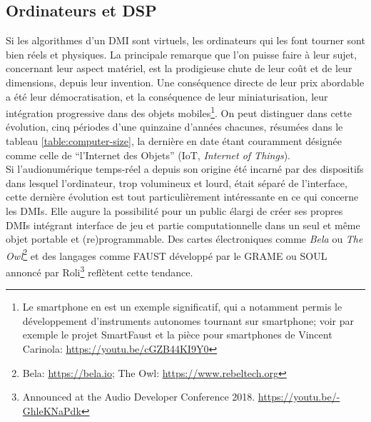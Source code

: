 \subsection{Ordinateurs et DSP}
\label{sec:interfaces:computers_and_dsp}

\noindent Si les algorithmes d'un \gls{DMI} sont virtuels, les ordinateurs qui les font tourner sont bien réels et physiques. La principale remarque que l'on puisse faire à leur sujet, concernant leur aspect matériel, est la prodigieuse chute de leur coût et de leur dimensions, depuis leur invention. Une conséquence directe de leur prix abordable a été leur démocratisation, et la conséquence de leur miniaturisation, leur intégration progressive dans des objets mobiles\footnote{Le smartphone en est un exemple significatif, qui a notamment permis le développement d'instruments autonomes tournant sur smartphone; voir par exemple le projet SmartFaust et la pièce pour smartphones de Vincent Carinola: \url{https://youtu.be/cGZB44KI9Y0}}. On peut distinguer dans cette évolution, cinq périodes d'une quinzaine d'années chacunes, résumées dans le tableau \ref{table:computer-size}, la dernière en date étant couramment désignée comme celle de ``l'Internet des Objets'' (IoT, \textit{Internet of Things}).\\
\indent Si l'audionumérique temps-réel a depuis son origine été incarné par des dispositifs dans lesquel l'ordinateur, trop volumineux et lourd, était séparé de l'interface, cette dernière évolution est tout particulièrement intéressante en ce qui concerne les \glspl{DMI}. Elle augure la possibilité pour un public élargi de créer ses propres \glspl{DMI} intégrant interface de jeu et partie computationnelle dans un seul et même objet portable et (re)programmable. Des cartes électroniques comme \textit{Bela} ou \textit{The Owl}\footnote{Bela: \url{https://bela.io}; The Owl: \url{https://www.rebeltech.org}} et des langages comme \gls{FAUST} développé par le \gls{GRAME} \cite{orlarey_faust_2008} ou SOUL annoncé par Roli\footnote{Announced at the Audio Developer Conference 2018. \url{https://youtu.be/-GhleKNaPdk}} reflètent cette tendance.

